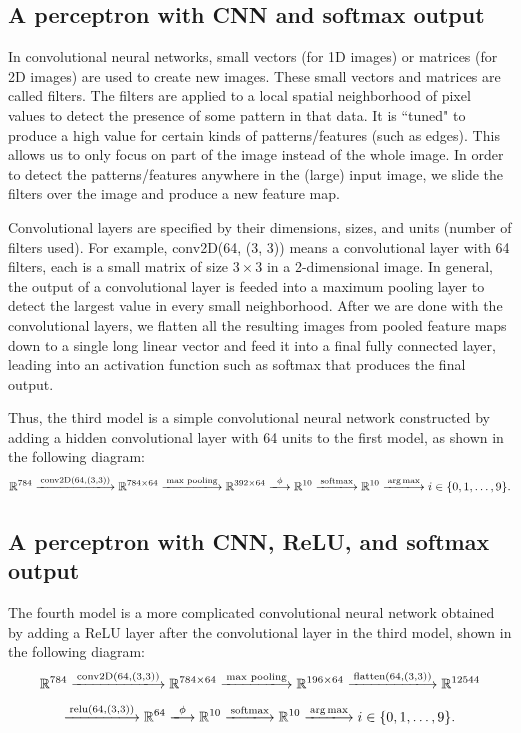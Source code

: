 \documentclass[11pt]{amsart}
\begin{document}
\subsection{A perceptron with CNN and softmax output} In convolutional neural networks, small vectors (for 1D images) or matrices (for 2D images) are used to create new images. These small vectors and matrices are called filters. The filters are applied to a local spatial neighborhood of pixel values to detect the presence of some pattern in that data. It is ``tuned" to produce a high value for certain kinds of patterns/features (such as edges). This allows us to only focus on part of the image instead of the whole image. In order to detect the patterns/features anywhere in the (large) input image, we slide the filters over the image and produce a new feature map.

Convolutional layers are specified by their dimensions, sizes, and units (number of filters used). For example, conv2D(64, (3, 3)) means a convolutional layer with 64 filters, each is a small matrix of size $3\times 3$ in a 2-dimensional image. In general, the output of a convolutional layer is feeded into a maximum pooling layer to detect the largest value in every small neighborhood. After we are done with the convolutional layers, we flatten all the resulting images from pooled feature maps down to a single long linear vector and feed it into a final fully connected layer, leading into an activation function such as softmax that produces the final output.

Thus, the third model is a simple convolutional neural network constructed by adding a hidden convolutional layer with 64 units to the first model, as shown in the following diagram:
$$
\mathbb{R}^{784} \xlongrightarrow{{\rm conv2D}(64, (3, 3))} \mathbb{R}^{784\times 64} \xlongrightarrow{\rm max \,\, pooling} \mathbb{R}^{392\times 64} \xlongrightarrow{\,\,\phi\,\,} \mathbb{R}^{10} \xlongrightarrow{\rm softmax}\mathbb{R}^{10}\xlongrightarrow{\rm arg\,max} i\in \{0, 1, \ldots, 9\}.
$$

\subsection{A perceptron with CNN, ReLU, and softmax output}
The fourth model is a more complicated convolutional neural network obtained by adding a ReLU layer after the convolutional layer in the third model, shown in the following diagram:
$$
\mathbb{R}^{784} \xlongrightarrow{{\rm conv2D}(64, (3, 3))} \mathbb{R}^{784\times 64} \xlongrightarrow{\rm max\,\, pooling} \mathbb{R}^{196\times 64}\xlongrightarrow{{\rm flatten}(64, (3, 3))} \mathbb{R}^{12544}
$$
$$\xlongrightarrow{{\rm relu}(64, (3, 3))} \mathbb{R}^{64}\xlongrightarrow{\,\,\phi\,\,} \mathbb{R}^{10} \xlongrightarrow{\rm softmax}\mathbb{R}^{10}\xlongrightarrow{\rm arg\,max} i\in \{0, 1, \ldots, 9\}.
$$
\end{document}
